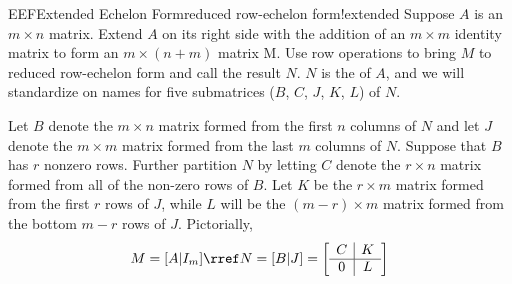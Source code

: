 \begin{definition}{EEF}{Extended Echelon Form}{reduced row-echelon form!extended}
Suppose $A$ is an $m\times n$ matrix.  Extend $A$ on its right side with the addition of an $m\times m$ identity matrix to form an $m\times (n + m)$ matrix M.  Use row operations to bring $M$ to reduced row-echelon form and call the result $N$.  $N$ is the  of $A$, and we will standardize on names for five submatrices ($B$, $C$, $J$, $K$, $L$) of $N$.\par
%
Let $B$ denote the $m\times n$ matrix formed from the first $n$ columns of $N$ and let $J$ denote the $m\times m$ matrix formed from the last $m$ columns of $N$.  Suppose that $B$ has $r$ nonzero rows.  Further partition $N$ by letting $C$ denote the $r\times n$ matrix formed from all of the non-zero rows of $B$.  Let $K$ be the $r\times m$ matrix formed from the first $r$ rows of $J$, while $L$ will be the $(m-r)\times m$ matrix formed from the bottom $m-r$ rows of $J$.  Pictorially,
%
\begin{equation*}
M=[A\vert I_m]
\rref
N=[B\vert J]
=
\left[\begin{array}{c|c}C&K\\\hline 0&L\end{array}\right]
\end{equation*}
%
\end{definition}
%
%
